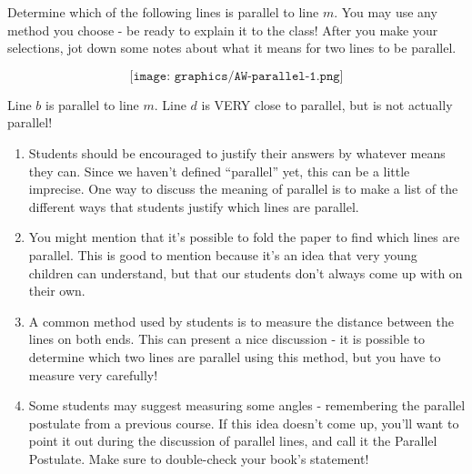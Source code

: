 \documentclass{ximera}
\begin{document}
\begin{problem}
Determine which of the following lines is parallel to line $m$.  You may use any method you choose - be ready to explain it to the class!  After you make your selections, jot down some notes about what it means for two lines to be parallel.

\vskip 1.5in
\[
\texttt{[image: graphics/AW-parallel-1.png]}
\]

\begin{solution}
    Line $b$ is parallel to line $m$.  Line $d$ is VERY close to parallel, but is not actually parallel!
\end{solution}

\begin{instructorNotes}
\begin{enumerate}
\item Students should be encouraged to justify their answers by whatever means they can.  Since we haven't defined ``parallel'' yet, this can be a little imprecise.  One way to discuss the meaning of parallel is to make a list of the different ways that students justify which lines are parallel.
\item You might mention that it's possible to fold the paper to find which lines are parallel.  This is good to mention because it's an idea that very young children can understand, but that our students don't always come up with on their own.
\item A common method used by students is to measure the distance between the lines on both ends.  This can present a nice discussion - it is possible to determine which two lines are parallel using this method, but you have to measure very carefully!
\item Some students may suggest measuring some angles - remembering the parallel postulate from a previous course.  If this idea doesn't come up, you'll want to point it out during the discussion of parallel lines, and call it the Parallel Postulate.  Make sure to double-check your book's statement!
\end{enumerate}
\end{instructorNotes}
\end{problem}
\end{document}

